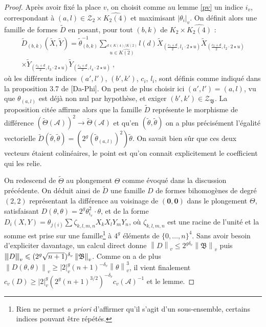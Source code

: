 \documentclass[11pt, twoside, a4paper, french]{article}
\numberwithin{equation}{section}
\newcommand{\lat}[1]{\emph{#1}} \newcommand{\pmm}[1]{\ \text{#1}}
\renewcommand{\ge}{\geqslant} \renewcommand{\le}{\leqslant}
\newcommand{\av}[2][v]{\left\lvert#2\right\rvert_{#1}} 		%
\newcommand{\nv}[2][v]{\left\lVert#2\right\rVert_{#1}} 		%
\newcommand{\nnv}[2][v]{\left\lvert\hspace{-1pt}\left\lvert\hspace{-1pt}\left\lvert#2\right\rvert\hspace{-1pt}\right\rvert\hspace{-1pt}\right\rvert_{#1}}
\newcommand{\dv}{{\delta_v}} 					%
\newcommand{\A}{\mathcal{A}} 					%
\newcommand{\p}[1]{{\boldsymbol{#1}}} 				%
\newcommand{\OA}{\p{0}} 					%
\newcommand{\coa}{\theta} 					%
\newcommand{\BA}{\mathfrak{B}} 					%
\begin{document}
\begin{proof}
Après avoir fixé la place $v$, on choisit comme au lemme \ref{pv} un indice $i_v$, correspondant à $(a, l) \in \mathcal{Z}_2 \times \widehat{K_2(4)}$ et maximisant $\av{\coa_i}$. On définit alors une famille de formes $\tilde{D}$ en posant, pour tout $(b, k)$ de $K_2 \times \widehat{K_2(4)}$ :
\begin{multline*}
\tilde{D}_{(b, k)}(\tilde{X}, \tilde{Y}) = \tilde{\coa}_{(b, k)}^{-1} 
\sum_{\stackrel{d \in K(4)/K(2)}{u \in \widehat{K(2)}}} l(d) \tilde{X}_{(\frac{c_1+d}{2}, l_1\cdot2\star u)}
\tilde{X}_{(\frac{c_2+d}{2}, l_2\cdot2\star u)} \\\times \tilde{Y}_{(\frac{c_3+d}{2}, l_3\cdot2\star u)} \tilde{Y}_{(\frac{c_4+d}{2}, l_4\cdot2\star u)} \pmm{,}
\end{multline*}
où les différents indices $(a', l')$, $(b', k')$, $c_i$, $l_i$, sont définis comme indiqué dans la proposition 3.7 de [Da-Phi]. On peut de plus choisir ici $(a', l')= (a, l)$, vu que $\coa_{(a, l)}$ est déjà non nul par hypothèse, et exiger $(b', k') \in \mathcal{Z}_\BA$. La proposition citée affirme alors que la famille $\tilde{D}$ représente le morphisme de différence $(\tilde\Theta(\A))^2 \to \tilde\Theta(\A)$ et qu'en $(\tilde\coa, \tilde\coa)$ on a plus précisément l'égalité vectorielle $\tilde{D}(\tilde\coa, \tilde\coa) = \left( 2^g (\tilde\coa_{(a, l)})^2\right) \tilde\coa$. On savait bien sûr que ces deux vecteurs étaient colinéaires, le point est qu'on connait explicitement le coefficient qui les relie.

On redescend de $\tilde\Theta$ au plongement $\Theta$ comme évoqué dans la discussion précédente. On déduit ainsi de $\tilde D$ une famille $D$ de formes bihomogènes de degré $(2, 2)$ représentant la différence au voisinage de $(\OA, \OA)$ dans le plongement $\Theta$, satisfaisant $D(\coa, \coa) = 2^g \coa_{i_v}^2 \cdot \coa$, et de la forme $D_i(X, Y)= \coa_{j(i)} \sum \zeta_{k,l,m,n} X_kX_lY_mY_n$, où $\zeta_{k,l,m,n}$ est une racine de l'unité et la somme est prise sur une famille\footnote{Rien ne permet \lat{a priori} d'affirmer qu'il s'agit d'un sous-ensemble, certains indices pouvant être répétés.} à $4^g$ éléments de $\{0, \dots, n\}^4$. Sans avoir besoin d'expliciter davantage, un calcul direct donne $\nv D \le 2^{g\dv} \nv\BA$ puis $\nnv{D} \le (2^g\sqrt{n+1})^\dv \nv\BA$. Comme on a de plus $\nv{D(\coa, \coa)} \ge \av{2}^g(n+1)^{-\dv}\nv\coa^3$, il vient finalement $c_v(D) \ge \av2^g (2^g(n+1)^{3/2})^{-\dv} c_v(\A)^{-1}$ et le lemme.
\end{proof}
\end{document}
